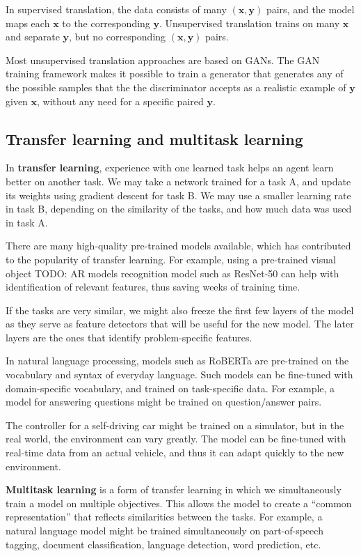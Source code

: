 \documentclass{article}
\renewcommand{\vec}[1]{\textbf{#1}}
\begin{document}
In supervised translation, the data consists of many $(\vec{x}, \vec{y})$ pairs,
and the model maps each $\vec{x}$ to the corresponding $\vec{y}$. Unsupervised
translation trains on many $\vec{x}$ and separate $\vec{y}$, but no corresponding
$(\vec{x}, \vec{y})$ pairs. 

Most unsupervised translation approaches are based on GANs. The GAN training framework
makes it possible to train a generator that generates any of the possible samples that the
the discriminator accepts as a realistic example of $\vec{y}$ given $\vec{x}$, without
any need for a specific paired $\vec{y}$.

\subsection{Transfer learning and multitask learning}

In \textbf{transfer learning}, experience with one learned task helps an agent learn
better on another task. We may take a network trained for a task A, and update its 
weights using gradient descent for task B. We may use a smaller learning rate 
in task B, depending on the similarity of the tasks, and how much data was used
in task A.

There are many high-quality pre-trained models available, which has contributed to 
the popularity of transfer learning. For example, using a pre-trained visual object
TODO: AR models
recognition model such as ResNet-50 can help with identification of relevant features,
thus saving weeks of training time.

If the tasks are very similar, we might also freeze the first few layers of the model
as they serve as feature
detectors that will be useful for the new model. The later layers are the ones that
identify problem-specific features.

In natural language processing, models such as RoBERTa are pre-trained on the
vocabulary and syntax of everyday language. Such models can be fine-tuned with
domain-specific vocabulary, and trained on task-specific data. For example,
a model for answering questions might be trained on question/answer pairs.

The controller for a self-driving car might be trained on a simulator, but in the real
world, the environment can vary greatly. The model can be fine-tuned with real-time
data from an actual vehicle, and thus it can adapt quickly to the new environment.

\textbf{Multitask learning} is a form of transfer learning in which we simultaneously
train a model on multiple objectives. This allows the model to create a ``common 
representation'' that reflects similarities between the tasks. For example, a natural
language model might be trained simultaneously on part-of-speech tagging, document
classification, language detection, word prediction, etc.
\end{document}
